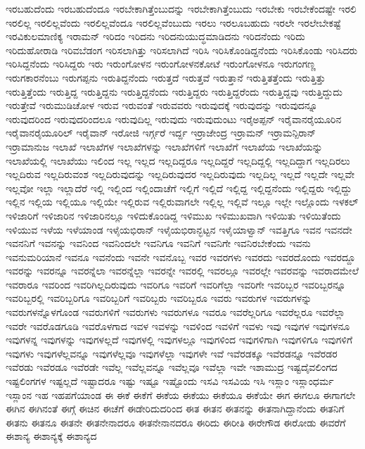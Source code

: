 {ಇರಬಹುದೆಂದು
ಇರಬಹುದೆಂದೂ
ಇರಬೇಕಾಗಿತ್ತೆಂಬುದನ್ನು
ಇರಬೇಕಾಗಿತ್ತೆಂಬುದು
ಇರಬೇಕು
ಇರಬೇಕೆಂದಷ್ಟೇ
ಇರಲಿ
ಇರಲಿಲ್ಲ
ಇರಲಿಲ್ಲವೆಂದು
ಇರಲಿಲ್ಲವೆಂದೂ
ಇರಲಿಲ್ಲವೆಂಬುದು
ಇರಲು
ಇರಲೂಬಹುದು
ಇರಲೇ
ಇರಲೇಬೇಕಷ್ಟೆ
ಇರವಿಕುಲಮಾಣಿಕ್ಯ
ಇರಾಮನ್
ಇರಿದಂ
ಇರಿದನು
ಇರಿದನುಯುದ್ಧಮಾಡಿದನು
ಇರಿದನೆಂದು
ಇರಿದು
ಇರಿದುಹೋರಾಡಿ
ಇರಿವಬೆಡಂಗ
ಇರಿಸಲಾಗಿತ್ತು
ಇರಿಸಲಾಗಿದೆ
ಇರಿಸಿ
ಇರಿಸಿಕೊಂಡಿದ್ದನೆಂದು
ಇರಿಸಿಕೊಂಡು
ಇರಿಸಿದರು
ಇರಿಸಿದ್ದನೆಂದು
ಇರಿಸಿದ್ದರು
ಇರು
ಇರುಂಗೋಳನ
ಇರುಂಗೋಳನಕೋಟೆ
ಇರುಂಗೋಳನೂ
ಇರುಗಂಗಣ್ಣ
ಇರುಗಕಾರನೆಂಬು
ಇರುಗಪ್ಪನು
ಇರುತಿದ್ದನೆಂದು
ಇರುತ್ತದೆ
ಇರುತ್ತವೆ
ಇರುತ್ತಾನೆ
ಇರುತ್ತಿತತ್ತೆಂದು
ಇರುತ್ತಿತ್ತು
ಇರುತ್ತಿತ್ತೆಂದು
ಇರುತ್ತಿದ್ದ
ಇರುತ್ತಿದ್ದನು
ಇರುತ್ತಿದ್ದನೆಂದು
ಇರುತ್ತಿದ್ದರು
ಇರುತ್ತಿದ್ದರೆಂದು
ಇರುತ್ತಿದ್ದವು
ಇರುತ್ತಿದ್ದುದು
ಇರುತ್ತೇವೆ
ಇರುಮುಡಿಚೋಳ
ಇರುವ
ಇರುವಂತೆ
ಇರುವವರು
ಇರುವುದಕ್ಕೆ
ಇರುವುದನ್ನು
ಇರುವುದನ್ನೂ
ಇರುವುದರಿಂದ
ಇರುವುದರಿಂದಲೂ
ಇರುವುದಿಲ್ಲ
ಇರುವುದು
ಇರುವುದುಂಟು
ಇರೈಅಪ್ಪನ್
ಇರೈವಾನರೈಯೂರಿನ
ಇರೈವಾನರೈಯೂರಿಲ್
ಇರೈವಾನ್
ಇರೋಜಿ
ಇರ್ಗ್ಗರೆ
ಇರ್ದ್ದ
ಇರ್ರಾಜೇಂದ್ರ
ಇರ್ರಾಮನ್
ಇರ್ರಾಮನ್ಪಿರಾನ್
ಇರ್ರಾಮಾನುಜ
ಇಲಾಖೆ
ಇಲಾಖೆಗಳ
ಇಲಾಖೆಗಳನ್ನು
ಇಲಾಖೆಗಳಿಗೆ
ಇಲಾಖೆಗೆ
ಇಲಾಖೆಯ
ಇಲಾಖೆಯನ್ನು
ಇಲಾಖೆಯಲ್ಲಿ
ಇಲಾಖೆಯು
ಇಲಿಂದ
ಇಲ್ಲ
ಇಲ್ಲದ
ಇಲ್ಲದಿದ್ದರೂ
ಇಲ್ಲದಿದ್ದರೆ
ಇಲ್ಲದಿದ್ದಲ್ಲಿ
ಇಲ್ಲದಿದ್ದಾಗ
ಇಲ್ಲದಿರಲು
ಇಲ್ಲದಿರುವ
ಇಲ್ಲದಿರುವಂಶ
ಇಲ್ಲದಿರುವುದನ್ನು
ಇಲ್ಲದಿರುವುದರ
ಇಲ್ಲದಿರುವುದು
ಇಲ್ಲದಿಲ್ಲ
ಇಲ್ಲದೆ
ಇಲ್ಲದೇ
ಇಲ್ಲವೇ
ಇಲ್ಲವೋ
ಇಲ್ಲಾ
ಇಲ್ಲಾದೆರೆ
ಇಲ್ಲಿ
ಇಲ್ಲಿಂದ
ಇಲ್ಲಿಂದಾಚೆಗೆ
ಇಲ್ಲಿಗೆ
ಇಲ್ಲಿದೆ
ಇಲ್ಲಿದ್ದ
ಇಲ್ಲಿದ್ದನೆಂದು
ಇಲ್ಲಿದ್ದರು
ಇಲ್ಲಿದ್ದು
ಇಲ್ಲಿನ
ಇಲ್ಲಿಯ
ಇಲ್ಲಿಯೂ
ಇಲ್ಲಿಯೇ
ಇಲ್ಲಿರುವ
ಇಲ್ಲಿರುವಾಗಲೇ
ಇಲ್ಲಿಲ್ಲ
ಇಲ್ಲಿವೆ
ಇಲ್ಲೂ
ಇಲ್ಲೇ
ಇಲ್ಲೊಂದು
ಇಳಕಲ್
ಇಳಿಜಾರಿಗೆ
ಇಳಿಜಾರಿನ
ಇಳಿಜಾರಿನಲ್ಲೂ
ಇಳಿದುಕೊಂಡಿದ್ದ
ಇಳಿಮುಖ
ಇಳಿಮುಖವಾಗಿ
ಇಳಿಯಿತು
ಇಳಿಯಿತೆಂದು
ಇಳಿಯುವ
ಇಳೆಯ
ಇಳೆಯಾಂಡ
ಇಳೈಯಭಿರಾನ್
ಇಳೈಯಭಿರಾನ್ಭಟ್ಟನ
ಇಳೈಯಾಳ್ವಾನ್
ಇವತ್ತಿಗೂ
ಇವನ
ಇವನದೇ
ಇವನನಿಗೆ
ಇವನನ್ನು
ಇವನಿಂದ
ಇವನಿಂದಲೇ
ಇವನಿಗೂ
ಇವನಿಗೆ
ಇವನಿಗೇ
ಇವನಿರಬೇಕೆಂದು
ಇವನು
ಇವನುಮರಿಯಾನೆ
ಇವನೂ
ಇವನೆಂದು
ಇವನೇ
ಇವನೊಬ್ಬ
ಇವರ
ಇವರಗಳು
ಇವರದು
ಇವರದೊಂದು
ಇವರದ್ದೂ
ಇವರನ್ನು
ಇವರನ್ನೂ
ಇವರನ್ನೆಲಾ
ಇವರನ್ನೆಲ್ಲಾ
ಇವರನ್ನೇ
ಇವರಲ್ಲಿ
ಇವರಲ್ಲೂ
ಇವರಲ್ಲೇ
ಇವರವನ್ನು
ಇವರಾದಮೇಲೆ
ಇವರಾರೂ
ಇವರಿಂದ
ಇವರಿಗಿಲ್ಲದಿರುವುದು
ಇವರಿಗೂ
ಇವರಿಗೆ
ಇವರಿಗೆಲ್ಲಾ
ಇವರಿಗೇ
ಇವರಿಬ್ಬರ
ಇವರಿಬ್ಬರನ್ನೂ
ಇವರಿಬ್ಬರಲ್ಲಿ
ಇವರಿಬ್ಬರಿಗೂ
ಇವರಿಬ್ಬರಿಗೆ
ಇವರಿಬ್ಬರು
ಇವರಿಬ್ಬರೂ
ಇವರು
ಇವರುಗಳ
ಇವರುಗಳನ್ನು
ಇವರುಗಳನ್ನೊಳಗೊಂಡ
ಇವರುಗಳಿಗೆ
ಇವರುಗಳು
ಇವರುಗಳೂ
ಇವರೂ
ಇವರೆಲ್ಲರಿಗೂ
ಇವರೆಲ್ಲರೂ
ಇವರೆಲ್ಲಾ
ಇವರೇ
ಇವರೊಡಗೂಡಿ
ಇವರೊಳಗಾದ
ಇವಳ
ಇವಳನ್ನು
ಇವಳಿಂದ
ಇವಳಿಗೆ
ಇವಳು
ಇವು
ಇವುಗಳ
ಇವುಗಳನೂ
ಇವುಗಳನ್ನ
ಇವುಗಳನ್ನು
ಇವುಗಳಲ್ಲದೆ
ಇವುಗಳಲ್ಲಿ
ಇವುಗಳಲ್ಲೂ
ಇವುಗಳಿಂದ
ಇವುಗಳಿಗಾಗಿ
ಇವುಗಳಿಗೂ
ಇವುಗಳಿಗೆ
ಇವುಗಳು
ಇವುಗಳೆಲ್ಲವನ್ನೂ
ಇವುಗಳೆಲ್ಲವೂ
ಇವುಗಳೆಲ್ಲಾ
ಇವುಗಳೇ
ಇವೆ
ಇವೆರಡಕ್ಕೂ
ಇವೆರಡನ್ನೂ
ಇವೆರಡರ
ಇವೆರಡು
ಇವೆರಡೂ
ಇವೆರಡೇ
ಇವೆಲ್ಲ
ಇವೆಲ್ಲವನ್ನೂ
ಇವೆಲ್ಲವೂ
ಇವೆಲ್ಲಾ
ಇವೇ
ಇಶಾಮುದ್ರ
ಇಷ್ಟದೈವಲಿಂಗದ
ಇಷ್ಟಲಿಂಗಗಳ
ಇಷ್ಟಲ್ಲದೆ
ಇಷ್ಟಾದರೂ
ಇಷ್ಟು
ಇಷ್ಟೂ
ಇಷ್ಟೊಂದು
ಇಸವಿ
ಇಸವಿಯ
ಇಸಿ
ಇಸ್ಲಾಂ
ಇಸ್ಲಾಂಧರ್ಮ
ಇಸ್ಲಾಂನ
ಇಹ
ಇಹಪಗೆಯಾಂಡ
ಈ
ಈಕೆ
ಈಕೆಗೆ
ಈಕೆಯ
ಈಕೆಯು
ಈಕೆಯೂ
ಈಕೆಯೇ
ಈಗ
ಈಗಲೂ
ಈಗಾಗಲೇ
ಈಗಿನ
ಈಗಿನಂತೆ
ಈಗ್ಗೆ
ಈಚಿನ
ಈಚೆಗೆ
ಈಡೇರಿದುದರಿಂದ
ಈತ
ಈತನ
ಈತನನ್ನು
ಈತನಾಗಿದ್ದಾನೆಂದು
ಈತನಿಗೆ
ಈತನು
ಈತನೂ
ಈತನೇ
ಈತನೇನಾದರೂ
ಈತನೇನಾನದರೂ
ಈರಿದು
ಈರೀತಿ
ಈರೇಗೌಡ
ಈರೋಡು
ಈವರೆಗೆ
ಈಶಾನ್ಯ
ಈಶಾನ್ಯಕ್ಕೆ
ಈಶಾನ್ಯದ
}
